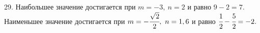 29. Наибольшее значение достигается при $m=-3,\ n=2$ и равно $9-2=7.$ Наименьшее значение достигается при $m=-\cfrac{\sqrt{2}}{2},\ n=1,6$ и равно $\cfrac{1}{2}-\cfrac{5}{2}=-2.$\\

